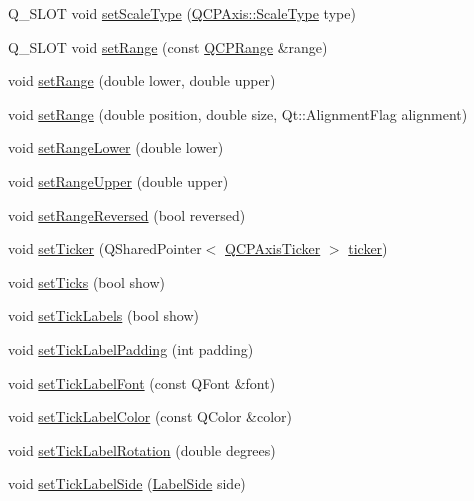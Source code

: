\begin{DoxyCompactItemize}
\item 
Q\+\_\+\+S\+L\+OT void \hyperlink{class_q_c_p_axis_adef29cae617af4f519f6c40d1a866ca6}{set\+Scale\+Type} (\hyperlink{class_q_c_p_axis_a36d8e8658dbaa179bf2aeb973db2d6f0}{Q\+C\+P\+Axis\+::\+Scale\+Type} type)
\item 
Q\+\_\+\+S\+L\+OT void \hyperlink{class_q_c_p_axis_aebdfea5d44c3a0ad2b4700cd4d25b641}{set\+Range} (const \hyperlink{class_q_c_p_range}{Q\+C\+P\+Range} \&range)
\item 
void \hyperlink{class_q_c_p_axis_a57d6ee9e9009fe88cb19db476ec70bca}{set\+Range} (double lower, double upper)
\item 
void \hyperlink{class_q_c_p_axis_acf60e5b2d631fbc8c4548c3d579cb6d0}{set\+Range} (double position, double size, Qt\+::\+Alignment\+Flag alignment)
\item 
void \hyperlink{class_q_c_p_axis_afcf51227d337db28d1a9ce9a4d1bc91a}{set\+Range\+Lower} (double lower)
\item 
void \hyperlink{class_q_c_p_axis_acd3ca1247aa867b540cd5ec30ccd3bef}{set\+Range\+Upper} (double upper)
\item 
void \hyperlink{class_q_c_p_axis_a2172fdb196b1a0dc3f40992fcad8e9e1}{set\+Range\+Reversed} (bool reversed)
\item 
void \hyperlink{class_q_c_p_axis_a4ee03fcd2c74d05cd1a419b9af5cfbdc}{set\+Ticker} (Q\+Shared\+Pointer$<$ \hyperlink{class_q_c_p_axis_ticker}{Q\+C\+P\+Axis\+Ticker} $>$ \hyperlink{class_q_c_p_axis_a7b7a27151be8235059e1294f73ecf615}{ticker})
\item 
void \hyperlink{class_q_c_p_axis_ac891409315bc379e3b1abdb162c1a011}{set\+Ticks} (bool show)
\item 
void \hyperlink{class_q_c_p_axis_a04ba16e1f6f78d70f938519576ed32c8}{set\+Tick\+Labels} (bool show)
\item 
void \hyperlink{class_q_c_p_axis_af302c479af9dbc2e9f0e44e07c0012ee}{set\+Tick\+Label\+Padding} (int padding)
\item 
void \hyperlink{class_q_c_p_axis_a2b8690c4e8dbc39d9185d2b398ce7a6c}{set\+Tick\+Label\+Font} (const Q\+Font \&font)
\item 
void \hyperlink{class_q_c_p_axis_a395e445c3fe496b935bee7b911ecfd1c}{set\+Tick\+Label\+Color} (const Q\+Color \&color)
\item 
void \hyperlink{class_q_c_p_axis_a1bddd4413df8a576b7ad4b067fb33375}{set\+Tick\+Label\+Rotation} (double degrees)
\item 
void \hyperlink{class_q_c_p_axis_a13ec644fc6e22715744c92c6dfa4f0fa}{set\+Tick\+Label\+Side} (\hyperlink{class_q_c_p_axis_a24b13374b9b8f75f47eed2ea78c37db9}{Label\+Side} side)

\end{DoxyCompactItemize}
